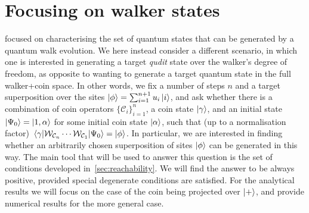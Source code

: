 \section{Focusing on walker states}
\label{sec:focusing_walker_states}

 focused on characterising the set of quantum states that can be generated by a quantum walk evolution.
We here instead consider a different scenario, in which one is interested in generating a target \emph{qudit} state over the walker's degree of freedom, as opposite to wanting to generate a target quantum state in the full walker+coin space.
In other words, we fix a number of steps $n$ and a target superposition over the sites $\ket\phi=\sum_{i=1}^{n+1} u_i\ket i$, and ask whether there is a combination of coin operators $\{\mathcal C_i\}_{i=1}^{n}$, a coin state $\ket\gamma$, and an initial state $\ket{\Psi_0}=\ket{1, \alpha}$ for some initial coin state $\ket\alpha$, such that (up to a normalisation factor)
$\mel{\gamma}{\mathcal W_{\mathcal C_{n}} \cdots\mathcal W_{\mathcal C_{1}}}{\Psi_0} = \ket\phi$.
In particular, we are interested in finding whether an arbitrarily chosen superposition of sites $\ket\phi$ can be generated in this way.
The main tool that will be used to answer this question is the set of conditions developed in~\cref{sec:reachability}.
We will find the answer to be always positive, provided special degenerate conditions are satisfied.
For the analytical results we will focus on the case of the coin being projected over $\ket+$,
and provide numerical results for the more general case.


